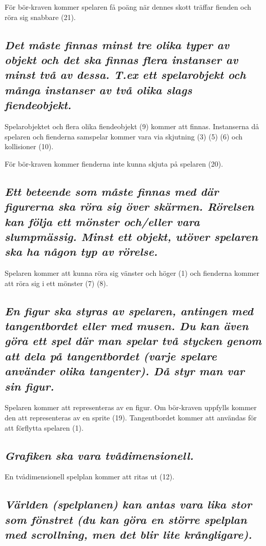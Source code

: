 \documentclass{TDP005mall}
\begin{document}
För bör-kraven kommer spelaren få poäng när dennes skott träffar fienden och röra sig snabbare (21).

\subsection{\textit{Det måste finnas minst tre olika typer av objekt och det ska finnas flera instanser av minst två av dessa. T.ex ett spelarobjekt och många instanser av två olika slags fiendeobjekt.}}

Spelarobjektet och flera olika fiendeobjekt (9) kommer att finnas. Instanserna då spelaren och fienderna samspelar kommer vara via skjutning (3) (5) (6) och kollisioner (10).

För bör-kraven kommer fienderna inte kunna skjuta på spelaren (20).

\subsection{\textit{Ett beteende som måste finnas med där figurerna ska röra sig över skärmen. Rörelsen kan följa ett mönster och/eller vara slumpmässig. Minst ett objekt, utöver spelaren ska ha någon typ av rörelse.}}

Spelaren kommer att kunna röra sig vänster och höger (1) och fienderna kommer att röra sig i ett mönster (7) (8).

\subsection{\textit{En figur ska styras av spelaren, antingen med tangentbordet eller med musen. Du kan även göra ett spel där man spelar två stycken genom att dela på tangentbordet (varje spelare använder olika tangenter). Då styr man var sin figur.}}

Spelaren kommer att representeras av en figur. Om bör-kraven uppfylls kommer den att representeras av en sprite (19). Tangentbordet kommer att användas för att förflytta spelaren (1).

\subsection{\textit{Grafiken ska vara tvådimensionell.}}

En tvådimensionell spelplan kommer att ritas ut (12).

\subsection{\textit{Världen (spelplanen) kan antas vara lika stor som fönstret (du kan göra en större spelplan med scrollning, men det blir lite krångligare).}}
\end{document}
